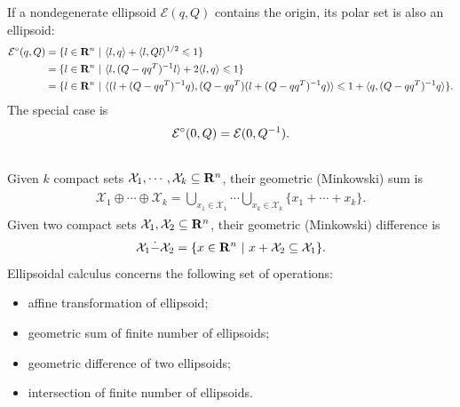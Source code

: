 \documentclass[letterpaper,10pt,english]{sphinxmanual}
\begin{document}
If a nondegenerate ellipsoid ${\mathcal E}(q,Q)$ contains the
origin, its polar set is also an ellipsoid:
\begin{gather}
\begin{split}\begin{aligned}
{\mathcal E}^\circ(q,Q) & = \{l\in{\bf R}^n ~|~ \langle l,q\rangle +
\langle l,Ql\rangle^{1/2}\leqslant1 \}\\
& = \{l\in{\bf R}^n ~|~ \langle l,(Q-qq^T)^{-1}l\rangle +
2\langle l,q\rangle\leqslant1 \}\\
& = \{l\in{\bf R}^n ~|~ \langle(l+(Q-qq^T)^{-1}q),
(Q-qq^T)(l+(Q-qq^T)^{-1}q)\rangle\leqslant1+\langle q,(Q-qq^T)^{-1}q\rangle \}.\end{aligned}\end{split}\notag
\end{gather}
The special case is
\begin{gather}
\begin{split}{\mathcal E}^\circ(0,Q) = {\mathcal E}(0,Q^{-1}).\end{split}\notag\\\begin{split}\end{split}\notag
\end{gather}
Given $k$ compact sets
${\mathcal X}_1, \cdots, {\mathcal X}_k\subseteq{\bf R}^n$, their
geometric (Minkowski) sum is
\label{main_source:equation-minksum}\begin{gather}
\begin{split}{\mathcal X}_1\oplus\cdots\oplus{\mathcal X}_k=\bigcup_{x_1\in{\mathcal X}_1}\cdots\bigcup_{x_k\in{\mathcal X}_k}
\{x_1 + \cdots + x_k\} .\end{split}\label{main_source-minksum}
\end{gather}
Given two compact sets
${\mathcal X}_1, {\mathcal X}_2 \subseteq{\bf R}^n$, their
geometric (Minkowski) difference is
\label{main_source:equation-minkdiff}\begin{gather}
\begin{split}{\mathcal X}_1\dot{-}{\mathcal X}_2 = \{x\in{\bf R}^n ~|~ x + {\mathcal X}_2 \subseteq {\mathcal X}_1 \}.\end{split}\label{main_source-minkdiff}
\end{gather}
Ellipsoidal calculus concerns the following set of operations:
\begin{itemize}
\item {} 
affine transformation of ellipsoid;

\item {} 
geometric sum of finite number of ellipsoids;

\item {} 
geometric difference of two ellipsoids;

\item {} 
intersection of finite number of ellipsoids.

\end{itemize}
\end{document}
